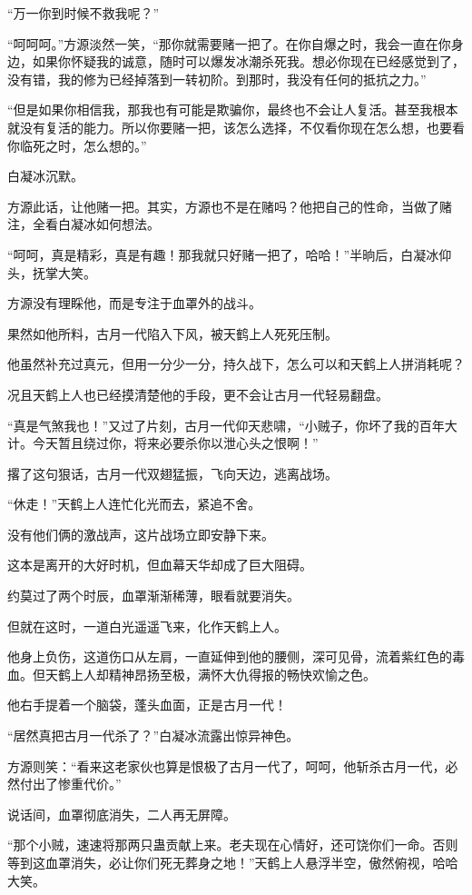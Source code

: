 \begin{this_body}
“万一你到时候不救我呢？”

“呵呵呵。”方源淡然一笑，“那你就需要赌一把了。在你自爆之时，我会一直在你身边，如果你怀疑我的诚意，随时可以爆发冰潮杀死我。想必你现在已经感觉到了，没有错，我的修为已经掉落到一转初阶。到那时，我没有任何的抵抗之力。”

“但是如果你相信我，那我也有可能是欺骗你，最终也不会让人复活。甚至我根本就没有复活的能力。所以你要赌一把，该怎么选择，不仅看你现在怎么想，也要看你临死之时，怎么想的。”

白凝冰沉默。

方源此话，让他赌一把。其实，方源也不是在赌吗？他把自己的性命，当做了赌注，全看白凝冰如何想法。

“呵呵，真是精彩，真是有趣！那我就只好赌一把了，哈哈！”半晌后，白凝冰仰头，抚掌大笑。

方源没有理睬他，而是专注于血罩外的战斗。

果然如他所料，古月一代陷入下风，被天鹤上人死死压制。

他虽然补充过真元，但用一分少一分，持久战下，怎么可以和天鹤上人拼消耗呢？

况且天鹤上人也已经摸清楚他的手段，更不会让古月一代轻易翻盘。

“真是气煞我也！”又过了片刻，古月一代仰天悲啸，“小贼子，你坏了我的百年大计。今天暂且绕过你，将来必要杀你以泄心头之恨啊！”

撂了这句狠话，古月一代双翅猛振，飞向天边，逃离战场。

“休走！”天鹤上人连忙化光而去，紧追不舍。

没有他们俩的激战声，这片战场立即安静下来。

这本是离开的大好时机，但血幕天华却成了巨大阻碍。

约莫过了两个时辰，血罩渐渐稀薄，眼看就要消失。

但就在这时，一道白光遥遥飞来，化作天鹤上人。

他身上负伤，这道伤口从左肩，一直延伸到他的腰侧，深可见骨，流着紫红色的毒血。但天鹤上人却精神昂扬至极，满怀大仇得报的畅快欢愉之色。

他右手提着一个脑袋，蓬头血面，正是古月一代！

“居然真把古月一代杀了？”白凝冰流露出惊异神色。

方源则笑：“看来这老家伙也算是恨极了古月一代了，呵呵，他斩杀古月一代，必然付出了惨重代价。”

说话间，血罩彻底消失，二人再无屏障。

“那个小贼，速速将那两只蛊贡献上来。老夫现在心情好，还可饶你们一命。否则等到这血罩消失，必让你们死无葬身之地！”天鹤上人悬浮半空，傲然俯视，哈哈大笑。


\end{this_body}
